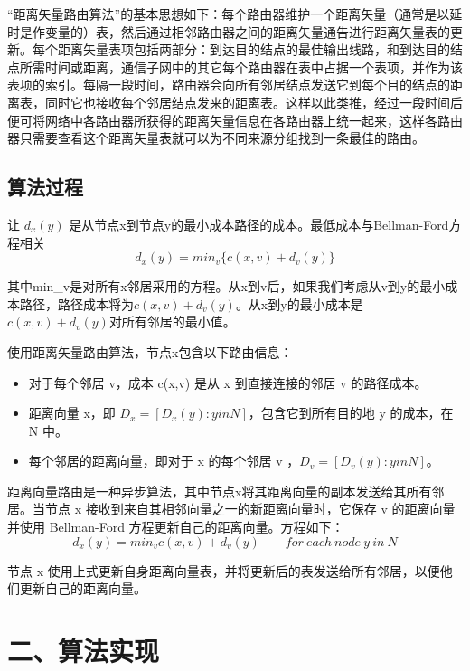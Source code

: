 \documentclass[UTF8,14pt]{article}
\numberwithin{figure}{section}
\begin{document}
“距离矢量路由算法”的基本思想如下：每个路由器维护一个距离矢量（通常是以延时是作变量的）表，然后通过相邻路由器之间的距离矢量通告进行距离矢量表的更新。每个距离矢量表项包括两部分：到达目的结点的最佳输出线路，和到达目的结点所需时间或距离，通信子网中的其它每个路由器在表中占据一个表项，并作为该表项的索引。每隔一段时间，路由器会向所有邻居结点发送它到每个目的结点的距离表，同时它也接收每个邻居结点发来的距离表。这样以此类推，经过一段时间后便可将网络中各路由器所获得的距离矢量信息在各路由器上统一起来，这样各路由器只需要查看这个距离矢量表就可以为不同来源分组找到一条最佳的路由。

\subsection{算法过程}
让 $d_x (y)$ 是从节点x到节点y的最小成本路径的成本。最低成本与Bellman-Ford方程相关
$$d_x(y)=min_v\{c(x,v)+ d_v(y)\}$$

其中min\_v是对所有x邻居采用的方程。从x到v后，如果我们考虑从v到y的最小成本路径，路径成本将为$c(x,v)+d_v(y)$。从x到y的最小成本是$c(x,v)+d_v(y)$对所有邻居的最小值。

使用距离矢量路由算法，节点x包含以下路由信息：

\begin{itemize}
    \setlength{\itemsep}{0pt}
          \setlength{\parsep}{0pt}
          \setlength{\parskip}{0pt}
    \item 对于每个邻居 v，成本 c(x,v) 是从 x 到直接连接的邻居 v 的路径成本。
    \item 距离向量 x，即 $D_x = [ D_x (y) : y in N ]$，包含它到所有目的地 y 的成本，在 N 中。
    \item 每个邻居的距离向量，即对于 x 的每个邻居 v ，$D_v = [ D_v (y) : y in N ]$。
\end{itemize}


距离向量路由是一种异步算法，其中节点x将其距离向量的副本发送给其所有邻居。当节点 x 接收到来自其相邻向量之一的新距离向量时，它保存 v 的距离向量并使用 Bellman-Ford 方程更新自己的距离向量。方程如下：
$$d_x (y) = min_v { c(x,v) + d_v (y)} \qquad for\ each\ node\ y\ in\ N$$

节点 x 使用上式更新自身距离向量表，并将更新后的表发送给所有邻居，以便他们更新自己的距离向量。

\section{二、算法实现}
\end{document}
